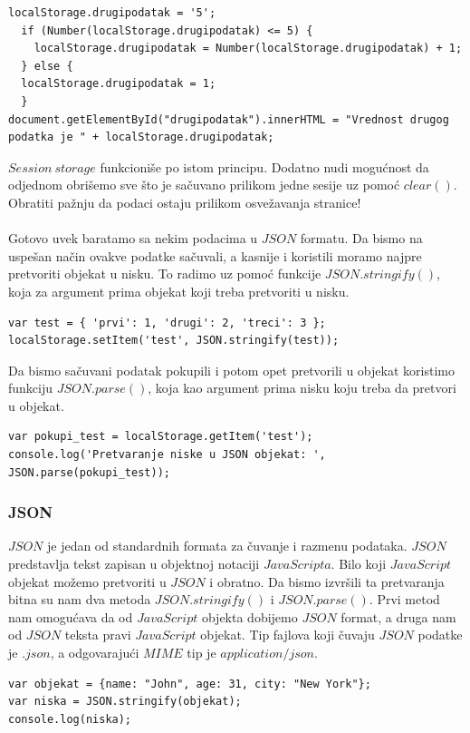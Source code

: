 \begin{lstlisting}[backgroundcolor = \color{lightgray}, breaklines=true]
localStorage.drugipodatak = '5';
  if (Number(localStorage.drugipodatak) <= 5) {
    localStorage.drugipodatak = Number(localStorage.drugipodatak) + 1;
  } else {
  localStorage.drugipodatak = 1;
  }
document.getElementById("drugipodatak").innerHTML = "Vrednost drugog podatka je " + localStorage.drugipodatak;
\end{lstlisting}
$Session\ storage$ funkcioniše po istom principu. Dodatno nudi mogućnost da odjednom obrišemo sve što je sačuvano prilikom jedne sesije uz pomoć $clear()$. Obratiti pažnju da podaci ostaju prilikom osvežavanja stranice! \\\\
Gotovo uvek baratamo sa nekim podacima u $JSON$ formatu. Da bismo na uspešan način ovakve podatke sačuvali, a kasnije i koristili moramo najpre pretvoriti objekat u nisku. To radimo uz pomoć funkcije $JSON.stringify()$, koja za argument prima objekat koji treba pretvoriti u nisku.
\begin{lstlisting}[backgroundcolor = \color{lightgray}, breaklines=true]
var test = { 'prvi': 1, 'drugi': 2, 'treci': 3 };
localStorage.setItem('test', JSON.stringify(test));
\end{lstlisting}
Da bismo sačuvani podatak pokupili i potom opet pretvorili u objekat koristimo funkciju $JSON.parse()$, koja kao argument prima nisku koju treba da pretvori u objekat. 
\begin{lstlisting}[backgroundcolor = \color{lightgray}, breaklines=true]
var pokupi_test = localStorage.getItem('test');
console.log('Pretvaranje niske u JSON objekat: ', JSON.parse(pokupi_test));
\end{lstlisting}

\subsubsection{JSON}
$JSON$ je jedan od standardnih formata za čuvanje i razmenu podataka. $JSON$ predstavlja tekst zapisan u objektnoj notaciji $JavaScripta$. Bilo koji $JavaScript$ objekat možemo pretvoriti u $JSON$ i obratno. Da bismo izvršili ta pretvaranja bitna su nam dva metoda $JSON.stringify()$ i $JSON.parse()$. Prvi metod nam omogućava da od $JavaScript$ objekta dobijemo $JSON$ format, a druga nam od $JSON$ teksta pravi $JavaScript$ objekat. Tip fajlova koji čuvaju $JSON$ podatke je $.json$, a odgovarajući $MIME$ tip je $application/json$.
\begin{lstlisting}[backgroundcolor = \color{lightgray}, breaklines=true]
var objekat = {name: "John", age: 31, city: "New York"};
var niska = JSON.stringify(objekat);
console.log(niska);
\end{lstlisting}

